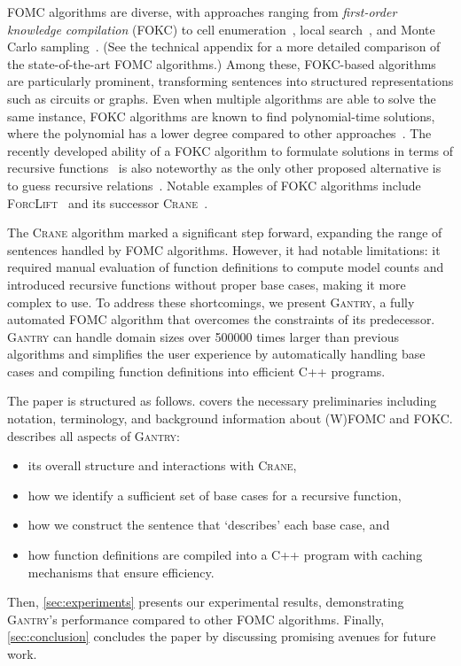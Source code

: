 \documentclass[a4paper,UKenglish,cleveref, autoref, thm-restate]{lipics-v2021}
\newcommand{\Cranetwo}{\textsc{Gantry}}
\begin{document}
FOMC algorithms are diverse, with approaches ranging from \emph{first-order
  knowledge compilation} (FOKC) to cell
enumeration~\cite{DBLP:conf/uai/BremenK21}, local
search~\cite{DBLP:journals/pvldb/NiuRDS11}, and Monte Carlo
sampling~\cite{DBLP:journals/cacm/GogateD16}. (See the technical appendix for a
more detailed comparison of the state-of-the-art FOMC algorithms.) Among these,
FOKC-based algorithms are particularly prominent, transforming sentences into
structured representations such as circuits or graphs. Even when multiple
algorithms are able to solve the same instance, FOKC algorithms are known to
find polynomial-time solutions, where the polynomial has a lower degree compared
to other approaches~\cite{DBLP:conf/kr/DilkasB23}. The recently developed
ability of a FOKC algorithm to formulate solutions in terms of recursive
functions~\cite{DBLP:conf/kr/DilkasB23} is also noteworthy as the only other
proposed alternative is to guess recursive
relations~\cite{DBLP:conf/ilp/BarvinekB0ZK21}. Notable examples of FOKC
algorithms include \textsc{ForcLift}~\cite{DBLP:conf/ijcai/BroeckTMDR11} and its
successor \textsc{Crane}~\cite{DBLP:conf/kr/DilkasB23}.


The \textsc{Crane} algorithm marked a significant step forward, expanding the
range of sentences handled by FOMC algorithms. However, it had notable
limitations: it required manual evaluation of function definitions to compute
model counts and introduced recursive functions without proper base cases,
making it more complex to use. To address these shortcomings, we present
\Cranetwo{}, a fully automated FOMC algorithm that overcomes the constraints of
its predecessor. \Cranetwo{} can handle domain sizes over \num{500000} times
larger than previous algorithms and simplifies the user experience by
automatically handling base cases and compiling function definitions into
efficient C++ programs.

The paper is structured as follows.  covers the
necessary preliminaries including notation, terminology, and background
information about (W)FOMC and FOKC\@.  describes all aspects of
\Cranetwo{}:
\begin{itemize}
  \item its overall structure and interactions with \textsc{Crane},
  \item how we identify a sufficient set of base cases for a recursive function,
  \item how we construct the sentence that `describes' each base case, and
  \item how function definitions are compiled into a C++ program with caching
        mechanisms that ensure efficiency.
\end{itemize}
Then, \cref{sec:experiments} presents our experimental results, demonstrating
\Cranetwo{}'s performance compared to other FOMC algorithms. Finally,
\cref{sec:conclusion} concludes the paper by discussing promising avenues for
future work.
\end{document}
